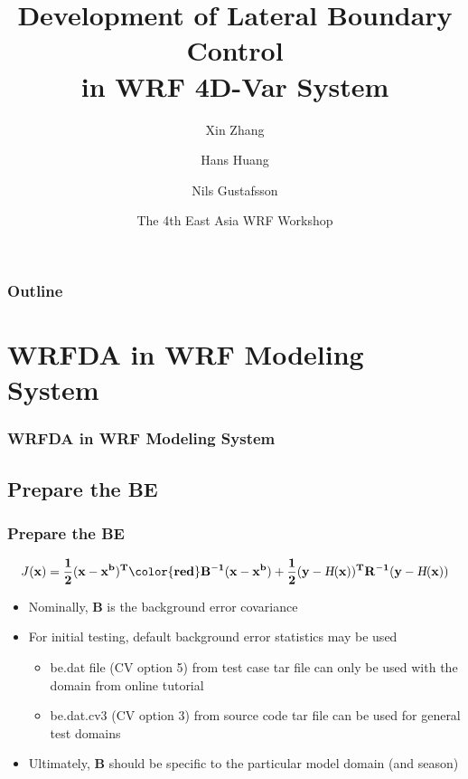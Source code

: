 \documentclass{beamer}
\begin{document}
\title[LBC control in WRF 4D-Var]{Development of Lateral Boundary Control \\in WRF 4D-Var System}

\author[Xin Zhang et al.]{Xin Zhang \and Hans Huang \and Nils Gustafsson}
\date{The 4th East Asia WRF Workshop}


\frame{\titlepage}

\begin{frame}
\frametitle{Outline} 
\tableofcontents
\end{frame}

\section{WRFDA in WRF Modeling System}

\begin{frame}
\frametitle{WRFDA in WRF Modeling System}
\end{frame}

\subsection{Prepare the BE}
\begin{frame}
\frametitle{Prepare the BE}
\begin{equation*}
J(\bf{x})=\frac{1}{2}(\bf{x}-\bf{x}^b)^T{\color{red}\bf{B}^{-1}}(\bf{x}-\bf{x}^b)+\frac{1}{2}(\bf{y}-\textsl{H}(\bf{x}))^T\bf{R}^{-1}(\bf{y}-\textsl{H}(\bf{x}))
\end{equation*}
\begin{itemize}
\item Nominally, {\color{red}$\mathbf{B}$} is the background error covariance \pause
\item For initial testing, default background error statistics may
be used \pause 
\begin{itemize}
\item be.dat file (CV option 5) from test case tar file can only be used
with the domain from online tutorial \pause
\item be.dat.cv3 (CV option 3) from source code tar file can be used for
general test domains 
\end{itemize} \pause
\item Ultimately, {\color{red}$\mathbf{B}$} should be specific to the particular
model domain (and season)
\end{itemize}
\end{frame}
\end{document}
